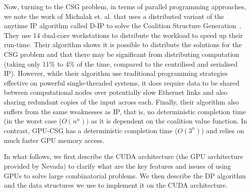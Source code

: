 \documentclass{llncs}
\begin{document}
Now, turning to the CSG problem, in terms of parallel programming approaches, we note the work of Michalak et. al. that uses a distributed variant of the anytime IP algorithm called D-IP to solve the Coalition Structure Generation~\cite{michalak2010distributed}. They use 14 dual-core workstations to distribute the workload to speed up their run-time. Their algorithm  shows it is possible to distribute the solutions for the CSG problem and that there may be significant from distributing computation (taking only 11\% to 4\% of the time, compared to the centrilised and serialised IP). However, while their algorithm use traditional programming strategies effective on powerful single-threaded systems, it does require data to be shared between computational nodes over potentially slow Ethernet links and also sharing redundant copies of the input across each. Finally, their algorithm also suffers from the same weaknesses as IP, that is, no deterministic completion time (in the worst case ($O(n^n))$ as it is dependent on the coalition value function. In contrast, GPU-CSG has a deterministic completion time ($O(3^n)$) and relies on much faster GPU memory access.

In what follows, we first describe the CUDA architecture (the GPU architecture provided by Nevada) to clarify what are the key features and issues of using GPUs to solve large combinatorial problems. We then describe the DP algorithm and the data structures we use to implement it on the CUDA architecture.
\end{document}
